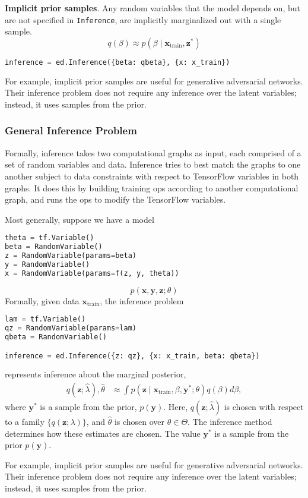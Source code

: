 \textbf{Implicit prior samples}.
Any random variables that the model depends on, but are not specified
in \texttt{Inference}, are implicitly marginalized out with a single
sample.
\begin{equation*}
q(\beta)\approx
p(\beta\mid\mathbf{x}_{\text{train}}, \mathbf{z}^*)
\end{equation*}

\begin{lstlisting}[language=Python]
inference = ed.Inference({beta: qbeta}, {x: x_train})
\end{lstlisting}

For example, implicit prior samples are useful for generative adversarial
networks. Their inference problem does not require any inference over
the latent variables; instead, it uses samples from the prior.

\subsubsection{General Inference Problem}

Formally, inference takes two computational graphs as input, each
comprised of a set of random variables and data.  Inference tries to
best match the graphs to one another subject to data constraints with
respect to TensorFlow variables in both graphs. It does this by
building training ops according to another computational graph, and
runs the ops to modify the TensorFlow variables.

Most generally, suppose we have a model
\begin{lstlisting}[language=Python]
theta = tf.Variable()
beta = RandomVariable()
z = RandomVariable(params=beta)
y = RandomVariable()
x = RandomVariable(params=f(z, y, theta))
\end{lstlisting}
\begin{equation*}
p(\mathbf{x}, \mathbf{y}, \mathbf{z}; \theta)
\end{equation*}
Formally,
given data $\mathbf{x}_{\text{train}}$,
the inference problem
\begin{lstlisting}[language=Python]
lam = tf.Variable()
qz = RandomVariable(params=lam)
qbeta = RandomVariable()

inference = ed.Inference({z: qz}, {x: x_train, beta: qbeta})
\end{lstlisting}
represents inference about the marginal posterior,
\begin{align*}
q(\mathbf{z}; \hat{\lambda}), \hat{\theta}
&\approx
\int p(\mathbf{z}\mid \mathbf{x}_{\text{train}}, \beta, \mathbf{y}^*; \theta) q(\beta) d\beta
,
\end{align*}
where $\mathbf{y}^*$ is a sample from the prior, $p(\mathbf{y})$.
Here, $q(\mathbf{z}; \hat{\lambda})$ is chosen with respect to a
family $\{q(\mathbf{z}; \lambda)\}$, and $\hat{\theta}$ is chosen over
$\theta\in\Theta$. The inference method determines how these estimates
are chosen. The value $\mathbf{y}^*$ is a sample from the prior $p(\mathbf{y})$.

For example, implicit prior samples are useful for generative adversarial
networks. Their inference problem does not require any inference over
the latent variables; instead, it uses samples from the prior.
